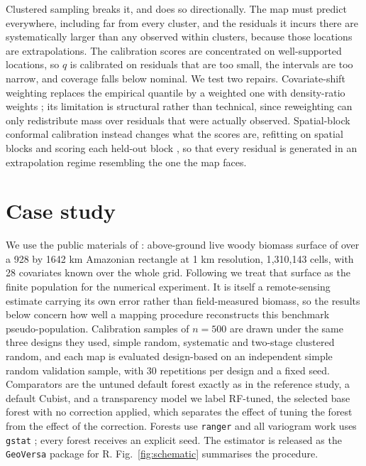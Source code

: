 \documentclass[preprint,12pt,authoryear]{elsarticle}
\begin{document}
Clustered sampling breaks it, and does so directionally. The map must predict
everywhere, including far from every cluster, and the residuals it incurs there
are systematically larger than any observed within clusters, because those
locations are extrapolations. The calibration scores are concentrated on
well-supported locations, so $q$ is calibrated on residuals that are too small,
the intervals are too narrow, and coverage falls below nominal. We test two
repairs. Covariate-shift weighting replaces the empirical quantile by a weighted
one with density-ratio weights \citep{tibshirani2019}; its limitation is
structural rather than technical, since reweighting can only redistribute mass
over residuals that were actually observed. Spatial-block conformal calibration
instead changes what the scores are, refitting on spatial blocks and scoring each
held-out block \citep{roberts2017}, so that every residual is generated in an
extrapolation regime resembling the one the map faces.

\section{Case study}
\label{sec:case}

We use the public materials of \citet{wadoux2021}: above-ground live woody
biomass surface of \citet{baccini2012} over a 928 by 1642 km Amazonian rectangle at 1 km
resolution, 1{,}310{,}143 cells, with 28 covariates known over the whole grid.
Following \citet{wadoux2021} we treat that surface as the finite population for
the numerical experiment. It is itself a remote-sensing estimate carrying its own
error rather than field-measured biomass, so the results below concern how well a
mapping procedure reconstructs this benchmark pseudo-population.
Calibration samples of $n = 500$ are drawn under the same three designs they
used, simple random, systematic and two-stage clustered random, and each map is
evaluated design-based on an independent simple random validation sample, with
30 repetitions per design and a fixed seed. Comparators are the untuned default
forest exactly as in the reference study, a default Cubist, and a transparency
model we label RF-tuned, the selected base forest with no correction applied,
which separates the effect of tuning the forest from the effect of the
correction. Forests use \texttt{ranger} \citep{wright2017} and all variogram
work uses \texttt{gstat} \citep{pebesma2004}; every forest receives an explicit
seed. The estimator is released as the \texttt{GeoVersa} package for R.
Fig.~\ref{fig:schematic} summarises the procedure.
\end{document}

